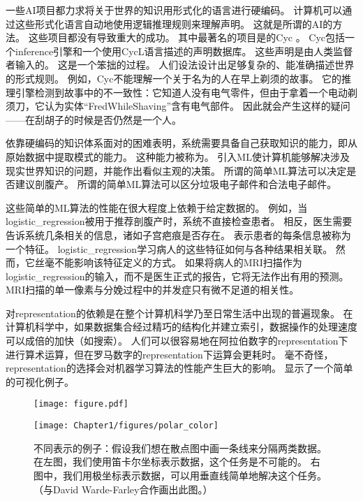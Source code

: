 一些\gls{AI}项目都力求将关于世界的知识用形式化的语言进行硬编码。
计算机可以通过这些形式化语言自动地使用逻辑推理规则来理解声明。
这就是所谓的\gls{AI}的方法。
这些项目都没有导致重大的成功。
其中最著名的项目是的Cyc \citep{Lenat-1989-book}。
Cyc包括一个\gls{inference}引擎和一个使用CycL语言描述的声明数据库。
这些声明是由人类监督者输入的。
这是一个笨拙的过程。
人们设法设计出足够复杂的、能准确描述世界的形式规则。
例如，Cyc不能理解一个关于名为的人在早上剃须的故事\citep{MachineChangedWorld}。
它的推理引擎检测到故事中的不一致性：它知道人没有电气零件，但由于拿着一个电动剃须刀，它认为实体``FredWhileShaving''含有电气部件。
因此就会产生这样的疑问——在刮胡子的时候是否仍然是一个人。

依靠硬编码的知识体系面对的困难表明，系统需要具备自己获取知识的能力，即从原始数据中提取模式的能力。
这种能力被称为。
引入\gls{ML}使计算机能够解决涉及现实世界知识的问题，并能作出看似主观的决策。
所谓的简单\gls{ML}算法可以决定是否建议剖腹产\citep{MorYosef90}。
所谓的简单\gls{ML}算法可以区分垃圾电子邮件和合法电子邮件。


这些简单的\gls{ML}算法的性能在很大程度上依赖于给定数据的。
例如，当\gls{logistic_regression}被用于推荐剖腹产时，系统不直接检查患者。
相反，医生需要告诉系统几条相关的信息，诸如子宫疤痕是否存在。
表示患者的每条信息被称为一个特征。
\gls{logistic_regression}学习病人的这些特征如何与各种结果相关联。
然而，它丝毫不能影响该特征定义的方式。
如果将病人的MRI扫描作为\gls{logistic_regression}的输入，而不是医生正式的报告，它将无法作出有用的预测。
MRI扫描的单一像素与分娩过程中的并发症只有微不足道的相关性。

对\gls{representation}的依赖是在整个计算机科学乃至日常生活中出现的普遍现象。
在计算机科学中，如果数据集合经过精巧的结构化并建立索引，数据操作的处理速度可以成倍的加快（如搜索）。
人们可以很容易地在阿拉伯数字的\gls{representation}下进行算术运算，但在罗马数字的\gls{representation}下运算会更耗时。
毫不奇怪，\gls{representation}的选择会对机器学习算法的性能产生巨大的影响。
显示了一个简单的可视化例子。
\begin{figure}[!htb]
\ifOpenSource
\centerline{\texttt{[image: figure.pdf]}}
\else
\centerline{\texttt{[image: Chapter1/figures/polar\_color]}}
\fi
\caption{不同表示的例子：假设我们想在散点图中画一条线来分隔两类数据。
在左图，我们使用笛卡尔坐标表示数据，这个任务是不可能的。 
右图中，我们用极坐标表示数据，可以用垂直线简单地解决这个任务。（与David Warde-Farley合作画出此图。）}
\label{fig:chap1_polar}
\end{figure}

